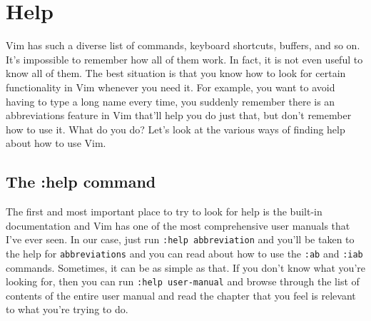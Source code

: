 \section{Help}
Vim has such a diverse list of commands, keyboard shortcuts, buffers, and so
on. It's impossible to remember how all of them work. In fact, it is not even
useful to know all of them. The best situation is that you know how to look for
certain functionality in Vim whenever you need it. For example, you want to
avoid having to type a long name every time, you suddenly remember there is an
abbreviations feature in Vim that'll help you do just that, but don't remember
how to use it. What do you do? Let's look at the various ways of finding help
about how to use Vim. 

\subsection{The :help command} 
The first and most important place to try to look for help is the built-in
documentation and Vim has one of the most comprehensive user manuals that I've
ever seen. In our case, just run \texttt{:help abbreviation} and you'll be
taken to the help for \texttt{abbreviations} and you can read about how to use
the \texttt{:ab} and \texttt{:iab} commands. Sometimes, it can be as simple as
that. If you don't know what you're looking for, then you can run \texttt{:help
user-manual} and browse through the list of contents of the entire user manual
and read the
chapter that you feel is relevant to what you're trying to do. 

